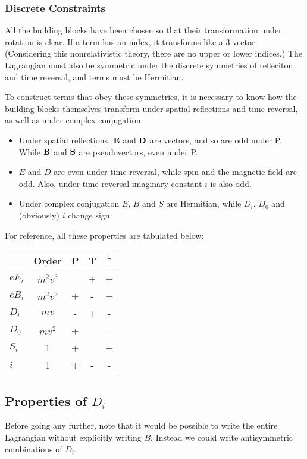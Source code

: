 \subsubsection{Discrete Constraints}
All the building blocks have been chosen so that their transformation under rotation is clear.  If a term has an index, it transforms like a 3-vector.  (Considering this nonrelativistic theory, there are no upper or lower indices.)  The Lagrangian must also be symmetric under the discrete symmetries of refleciton and time reversal, and terms must be Hermitian.  

To construct terms that obey these symmetries, it is necessary to know how the building blocks themselves transform under spatial reflections and time reversal, as well as under complex conjugation.
 \begin{itemize}
   \item  Under spatial reflections, $\mathbf{E}$ and $\mathbf{D}$ are vectors, and so are odd under P.  While $\mathbf{B}$  and $\mathbf{S}$ are pseudovectors, even under P.
   \item  $E$ and $D$ are even under time reversal, while spin and the magnetic field are odd.  Also, under time reversal imaginary constant $i$ is also odd.
   \item Under complex conjugation $E$, $B$ and $S$ are Hermitian, while $D_i$, $D_0$ and (obviously) $i$ change sign. 
 \end{itemize}
 
 For reference, all these properties are tabulated below:

 
\begin{tabular}{l|c|ccc}
& Order	&	P	&	T	&	$\dagger$	\\
\hline
$eE_i$	&$m^2v^3$	&	-	& 	+	&	+		\\
$eB_i$	&$m^2v^2$	&	+	&   -	&	+		\\
$D_i$		& $mv$	&	-	&	+	&	-		\\
$D_0$		& $mv^2$	&	+	&	-	&	-		\\
$S_i$		& 1		&	+	&	-	&	+		\\
$i$		& 1		&	+	&	-	&	-		\\
\end{tabular}

\subsection{Properties of $D_i$}
Before going any further, note that it would be possible to write the entire Lagrangian without explicitly writing $B$.  Instead we could write antisymmetric combinations of $D_i$.  


